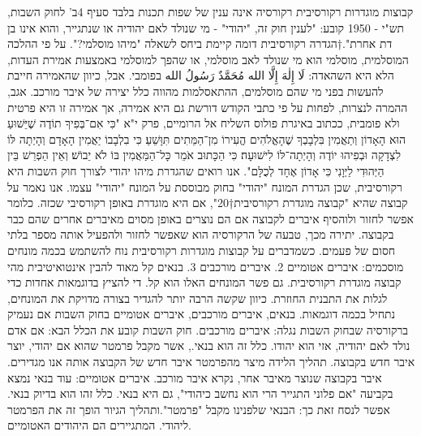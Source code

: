 קבוצות מוגדרות רקורסיבית
רקורסיה אינה ענין של שפות תכנות בלבד
סעיף 4ב' לחוק השבות, תש"י - 1950 קובע:
"לענין חוק זה, "יהודי" - מי שנולד לאם יהודיה או שנתגייר, והוא אינו בן דת אחרת".†{הגדרה רקורסיבית דומה קיימת ביחס לשאלה "מיהו מוסלמי?". על פי ההלכה המוסלמית, מוסלמי הוא מי שנולד לאב מוסלמי, או שהפך למוסלמי באמצעות אמירת העדות, הלא היא השהאדה: لَا إِلٰهَ إِلَّا الله مُحَمَّدٌ رَسُولُ الله בפומבי. אבל, כיוון שהאמירה חייבת להעשות בפני מי שהם מוסלמים, ההתאסלמות מהווה כלל יצירה של איבר מורכב. אגב, ההמרה לנצרות, לפחות על פי כתבי הקודש דורשת גם היא אמירה, אך אמירה זו היא פרטית ולא פומבית, ככתוב באיגרת פולוס השליח אל הרומיים, פרק י"א "כִּי אִם־בְּפִיךָ תוֹדֶה שֶׁיֵּשׁוּעַ הוּא הָאָדוֹן וְתַאֲמִין בִּלְבָבְךָ שֶׁהָאֱלֹהִים הֱעִירוֹ מִן־הַמֵּתִים תִּוָּשֵׁעַ׃ כִּי בִלְבָבוֹ יַאֲמִין הָאָדָם וְהָיְתָה לּוֹ לִצְדָקָה וּבְפִיהוּ יוֹדֶה וְהָיְתָה־לּוֹ לִישׁוּעָה׃ כִּי הַכָּתוּב אֹמֵר כָּל־הַמַּאֲמִין בּוֹ לֹא יֵבוֹשׁ׃ וְאֵין הַפְרֵשׁ בֵּין הַיְּהוּדִי לַיְּוָנִי כִּי אָדוֹן אֶחָד לְכֻלָּם".}
אנו רואים שהגדרת מיהו יהודי לצורך חוק השבות היא רקורסיבית, שכן הגדרת המונח "יהודי" בחוק מבוססת על המונח "יהודי" עצמו.
אנו נאמר על קבוצה שהיא "קבוצה מוגדרת רקורסיבית†{20}", אם היא מוגדרת באופן רקורסיבי שכזה. כלומר אפשר לחזור ולוהסיף איברים לקבוצה אם הם נוצרים באופן מסוים מאיברים אחרים שהם כבר בקבוצה. יתירה מכך, טבעה של הרקורסיה הוא שאפשר לחזור ולהפעיל אותה מספר בלתי חסום של פעמים.
כשמדברים על קבוצות מוגדרות רקורסיבית נוח להשתמש בכמה מונחים מוסכמים:
איברים אטומיים
2. איברים מורכבים
3. בנאים
קל מאוד להבין אינטואיטיבית מהי קבוצה מוגדרת רקורסיבית. גם פשר המונחים האלו הוא קל. די להציץ בדוגמאות אחדות כדי לגלות את התבנית החוזרת. כיוון שקשה הרבה יותר להגדיר בצורה מדויקת את המונחים, נתחיל בכמה דוגמאות.
בנאים, איברים מורכבים, איברים אטומיים בחוק השבות
אם נעמיק ברקורסיה שבחוק השבות נגלה:
איברים מורכבים. חוק השבות קובע את הכלל הבא: אם אדם נולד לאם יהודיה, אזי הוא יהודו. כלל זה הוא בנאי., אשר מקבל פרמטר שהוא אם יהודי, יוצר איבר חדש בקבוצה. תהליך הלידה מיצר מהפרמטר איבר חדש של הקבוצה אותה אנו מגדירים. איבר בקבוצה שנוצר מאיבר אחר, נקרא איבר מורכב.
איברים אטומיים: עוד בנאי נמצא בקביעה "אם פלוני התגייר הרי הוא נחשב כיהודי", גם היא בנאי. כלל זהו הוא בדיוק בנאי. אפשר לנסח זאת כך: הבנאי שלפנינו מקבל "פרמטר".ותהליך הגיור הופך זה את הפרמטר ליהודי. המתגיירים הם היהודים האטומיים.

